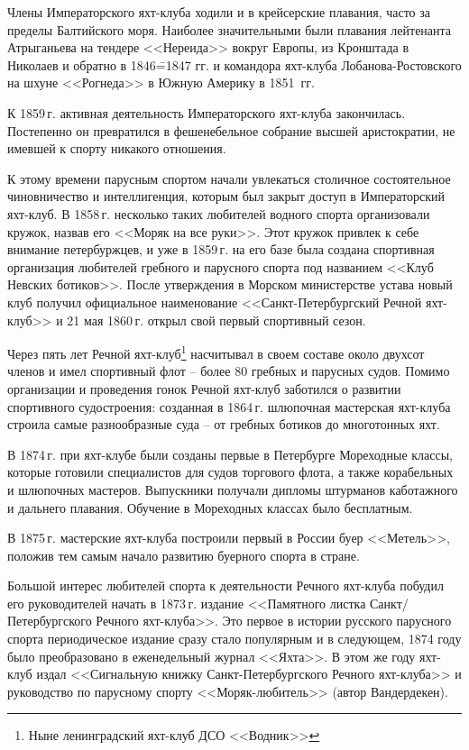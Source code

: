 \documentclass[a4paper, 12pt, twoside, final]{scrbook}
\begin{document}
Члены Императорского яхт-клуба ходили и в крейсерские плавания, часто
за пределы Балтийского моря. Наиболее значительными были плавания
лейтенанта Атрыганьева на тендере <<Нереида>> вокруг Европы, из Кронштада
в Николаев и обратно в 1846\==1847 гг. и командора яхт-клуба Лобанова-Ростовского
на шхуне <<Рогнеда>> в Южную Америку в 1851~гг.

К 1859\,г. активная деятельность Императорского яхт-клуба закончилась.
Постепенно он превратился в фешенебельное собрание высшей аристократии,
не имевшей к спорту никакого отношения.

К этому времени парусным спортом начали увлекаться столичное состоятельное
чиновничество и интеллигенция, которым был закрыт доступ в Императорский
яхт-клуб. В 1858\,г. несколько таких любителей водного спорта организовали
кружок, назвав его <<Моряк на все руки>>. Этот кружок привлек к себе
внимание петербуржцев, и уже в 1859\,г. на его базе была создана спортивная
организация любителей гребного и парусного спорта под названием <<Клуб
Невских ботиков>>. После утверждения в Морском министерстве устава
новый клуб получил официальное наименование <<Санкт-Петербургский Речной
яхт-клуб>> и 21 мая 1860\,г. открыл свой первый спортивный сезон.

Через пять лет Речной яхт-клуб\footnote{Ныне ленинградский яхт-клуб ДСО <<Водник>>}
насчитывал в своем составе около двухсот членов и имел спортивный
флот \--- более 80 гребных и парусных судов. Помимо организации и проведения
гонок Речной яхт-клуб заботился о развитии спортивного судостроения:
созданная в 1864\,г. шлюпочная мастерская яхт-клуба строила самые разнообразные
суда \--- от гребных ботиков до многотонных яхт. 

В 1874\,г. при яхт-клубе были созданы первые в Петербурге Мореходные
классы, которые готовили специалистов для судов торгового флота, а
также корабельных и шлюпочных мастеров. Выпускники получали дипломы
штурманов каботажного и дальнего плавания. Обучение в Мореходных классах
было бесплатным.

В 1875\,г. мастерские яхт-клуба построили первый в России буер <<Метель>>,
положив тем самым начало развитию буерного спорта в стране. 

Большой интерес любителей спорта к деятельности Речного яхт-клуба
побудил его руководителей начать в 1873\,г. издание <<Памятного листка
Санкт\-/Петербургского Речного яхт-клуба>>. Это первое в истории русского
парусного спорта периодическое издание сразу стало популярным и в
следующем, 1874 году было преобразовано в еженедельный журнал <<Яхта>>.
В этом же году яхт-клуб издал <<Сигнальную книжку Санкт-Петербургского
Речного яхт-клуба>> и руководство по парусному спорту <<Моряк-любитель>>
(автор Вандердекен).
\end{document}
